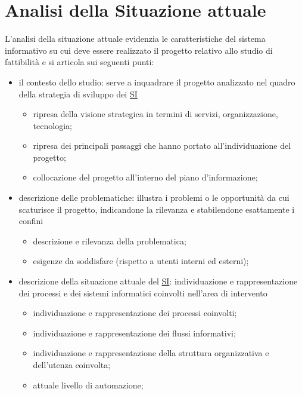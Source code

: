 \section{Analisi della Situazione attuale}\label{sec:ftt_analisi_della_situazione_attuale} %
L'analisi della situazione attuale evidenzia le caratteristiche del sistema informativo su cui deve essere realizzato il progetto relativo allo studio di fattibilità e si articola sui seguenti punti:
\begin{itemize}
    \item il contesto dello studio: serve a inquadrare il progetto analizzato nel quadro della strategia di sviluppo dei \hyperref[sub:il_sistema_informativo]{SI}
        \begin{itemize}
            \item ripresa della visione strategica in termini di servizi, organizzazione, tecnologia;
            \item ripresa dei principali passaggi che hanno portato all'individuazione del progetto;
            \item collocazione del progetto all'interno del piano d'informazione;
        \end{itemize}
    \item descrizione delle problematiche: illustra i problemi o le opportunità da cui scaturisce il progetto, indicandone la rilevanza e stabilendone esattamente i confini
        \begin{itemize}
            \item descrizione e rilevanza della problematica;
            \item esigenze da soddisfare (rispetto a utenti interni ed esterni);
        \end{itemize}
    \item descrizione della situazione attuale del \hyperref[sub:il_sistema_informativo]{SI}: individuazione e rappresentazione dei processi e dei sistemi informatici coinvolti nell'area di intervento
        \begin{itemize}
            \item individuazione e rappresentazione dei processi coinvolti;
            \item individuazione e rappresentazione dei flussi informativi;
            \item individuazione e rappresentazione della struttura organizzativa e dell'utenza coinvolta;
            \item attuale livello di automazione;
        \end{itemize}

\end{itemize}
